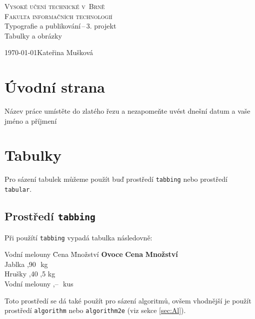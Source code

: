 \documentclass[11pt, a4paper]{article}
\begin{document}
\begin{titlepage}

\begin{center}
	\Huge \textsc{Vysoké učení technické v~Brně}\\
	\huge \textsc{Fakulta informačních technologií}\\
		
	\huge Typografie a publikování\,--\,3. projekt\\
	\Huge Tabulky a obrázky
\end{center}

{\Large \today \hfill Kateřina Mušková}
\end{titlepage}


\section{Úvodní strana}
Název práce umístěte do zlatého řezu a nezapomeňte uvést dnešní datum a vaše jméno a příjmení

\section{Tabulky}
Pro sázení tabulek můžeme použít buď prostředí \verb|tabbing| nebo prostředí \verb|tabular|.

\subsection{Prostředí \texttt{tabbing}}
Při použítí \verb|tabbing| vypadá tabulka následovně:

\begin{tabbing}
    Vodní melouny \qquad \= Cena \qquad \= Množství \kill
    \textbf{Ovoce} \>
    \textbf{Cena} \>
    \textbf{Množství} \\
    Jablka ,90 \,\,kg \\
    Hrušky ,40 ,5\,\,kg\\
    Vodní melouny ,-- \,\,kus \\
\end{tabbing}

Toto prostředí se dá také použít pro sázení algoritmů, ovšem vhodnější je použít prostředí \verb|algorithm| nebo \verb|algorithm2e| (viz sekce \ref{sec:Al}).   
   
\end{document}
